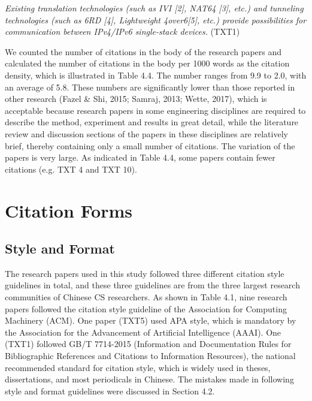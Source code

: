 \textit{Existing translation technologies (such as IVI [2], NAT64 [3], etc.) and tunneling technologies (such as 6RD [4], Lightweight 4over6[5], etc.) provide possibilities for communication between IPv4/IPv6 single-stack devices.} (TXT1)

We counted the number of citations in the body of the research papers and calculated the number of citations in the body per 1000 words as the citation density, which is illustrated in Table 4.4. The number ranges from 9.9 to 2.0, with an average of 5.8. These numbers are significantly lower than those reported in other research (Fazel \& Shi, 2015; Samraj, 2013; Wette, 2017), which is acceptable because research papers in some engineering disciplines are required to describe the method, experiment and results in great detail, while the literature review and discussion sections of the papers in these disciplines are relatively brief, thereby containing only a small number of citations. The variation of the papers is very large. As indicated in Table 4.4, some papers contain fewer citations (e.g. TXT 4 and TXT 10).

\section{Citation Forms}
\subsection{Style and Format}
The research papers used in this study followed three different citation style guidelines in total, and these three guidelines are from the three largest research communities of Chinese CS researchers. As shown in Table 4.1, nine research papers followed the citation style guideline of the Association for Computing Machinery (ACM). One paper (TXT5) used APA style, which is mandatory by the Association for the Advancement of Artificial Intelligence (AAAI). One (TXT1) followed GB/T 7714-2015 (Information and Documentation Rules for Bibliographic References and Citations to Information Resources), the national recommended standard for citation style, which is widely used in theses, dissertations, and most periodicals in Chinese. The mistakes made in following style and format guidelines were discussed in Section 4.2.

